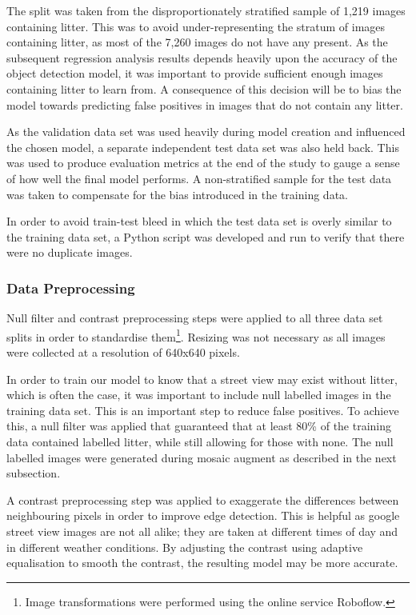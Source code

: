 \documentclass{thesis}
\begin{document}
The split was taken from the disproportionately stratified sample of 1,219 images containing litter. This was to avoid under-representing the stratum of images containing litter, as most of the 7,260 images do not have any present. As the subsequent regression analysis results depends heavily upon the accuracy of the object detection model, it was important to provide sufficient enough images containing litter to learn from. A consequence of this decision will be to bias the model towards predicting false positives in images that do not contain any litter.

As the validation data set was used heavily during model creation and influenced the chosen model, a separate independent test data set was also held back. This was used to produce evaluation metrics at the end of the study to gauge a sense of how well the final model performs. A non-stratified sample for the test data was taken to compensate for the bias introduced in the training data.

In order to avoid train-test bleed in which the test data set is overly similar to the training data set, a Python script was developed and run to verify that there were no duplicate images.

\subsubsection{Data Preprocessing}

Null filter and contrast preprocessing steps were applied to all three data set splits in order to standardise them\footnote{Image transformations were performed using the online service Roboflow.}. Resizing was not necessary as all images were collected at a resolution of 640x640 pixels. 

In order to train our model to know that a street view may exist without litter, which is often the case, it was important to include null labelled images in the training data set. This is an important step to reduce false positives. To achieve this, a null filter was applied that guaranteed that at least 80\% of the training data contained labelled litter, while still allowing for those with none. The null labelled images were generated during mosaic augment as described in the next subsection.

A contrast preprocessing step was applied to exaggerate the differences between neighbouring pixels in order to improve edge detection\cite{roboflow-contrast}. This is helpful as google street view images are not all alike; they are taken at different times of day and in different weather conditions. By adjusting the contrast using adaptive equalisation to smooth the contrast, the resulting model may be more accurate.
\end{document}
